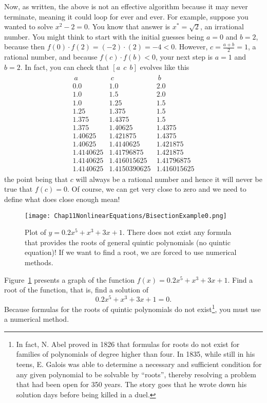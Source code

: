Now, as written, the above is not an effective algorithm because it may never terminate, meaning it could loop for ever and ever. For example, suppose you wanted to solve $x^2-2 = 0$. You know that answer is $x^\ast=\sqrt{2}$, an irrational number. You might think to start with the initial guesses being $a=0$ and $b=2$, because then $f(0) \cdot f(2) = (-2) \cdot (2) = -4 <0$. However, $c=\frac{a+b}{2} =1$, a rational number, and because $f(c) \cdot f(b)<0$, your next step is $a=1$ and $b=2$. In fact, you can check that $[a ~~c ~~b]$ evolves like this
\begin{align*}
\begin{array}{lll}
~a & ~c & ~b\\
0.0 & 1.0 & 2.0 \\
1.0 & 1.5 & 2.0 \\
1.0 & 1.25 & 1.5 \\
1.25 & 1.375 & 1.5 \\
1.375 & 1.4375 & 1.5 \\
1.375 & 1.40625 & 1.4375 \\
1.40625 & 1.421875 & 1.4375 \\
1.40625 & 1.4140625 & 1.421875 \\
1.4140625 & 1.41796875 & 1.421875 \\
1.4140625 & 1.416015625 & 1.41796875 \\
1.4140625 & 1.4150390625 & 1.416015625 
\end{array}
\end{align*}
the point being that $c$ will always be a rational number and hence it will never be true that $f(c)=0.$ Of course, we can get very close to zero and we need to define what does close enough mean!

   \begin{figure}[hbt!]
    \centering
    \texttt{[image: Chap11NonlinearEquations/BisectionExample0.png]}
    \caption[]{Plot of $y=0.2x^5  + x^3 + 3x + 1$. There does not exist any formula that provides the roots of general quintic polynomials (no quintic equation)! If we want to find a root, we are forced to use numerical methods.}
    \label{fig:BisectionExample1a}
    \end{figure}
    
\begin{example}
\label{ex:Bisection} 

Figure~\ref{fig:BisectionExample1a} presents a graph of the function $f(x)=0.2x^5  + x^3 + 3x + 1$. Find a root of the function, that is, find a solution of
$$0.2x^5  + x^3 + 3x + 1=0. $$
Because formulas for the roots of quintic polynomials do not exist\footnote{In fact, N. Abel proved in 1826 that formulas for roots do not exist for families of polynomials of degree higher than four. In 1835, while still in his teens, E. Galois was able to determine a necessary and sufficient condition for any given polynomial to be solvable by ``roots'', thereby resolving a problem that had been open for 350 years. The story goes that he wrote down his solution days before being killed in a duel.}, you must use a numerical method.


\end{example}

